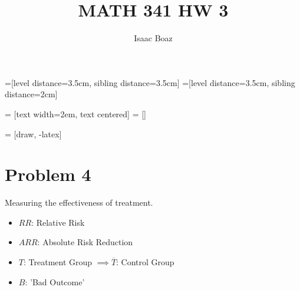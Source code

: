 \documentclass{article}
\title{\vspace{-5ex}MATH 341 HW 3}
\author{Isaac Boaz}
\begin{document}
=[level distance=3.5cm, sibling distance=3.5cm]
=[level distance=3.5cm, sibling distance=2cm]

 = [text width=2em, text centered]
 = []

 = [draw, -latex]

\maketitle

\section*{Problem 4}
Measuring the effectiveness of treatment.
\begin{itemize}[noitemsep]
    \item \(RR\): Relative Risk
    \item \(ARR\): Absolute Risk Reduction
    \item \(T\): Treatment Group \(\implies \overline{T}\): Control Group
    \item \(B\): 'Bad Outcome'
\end{itemize}
\end{document}
